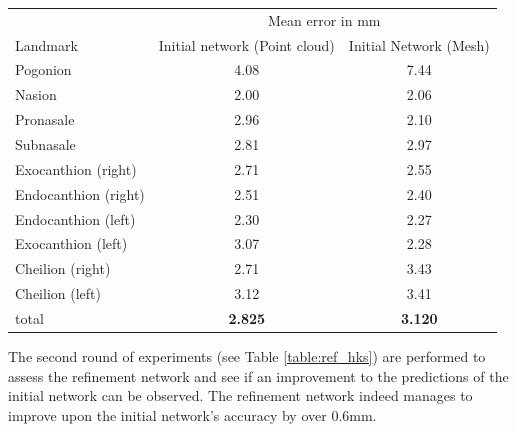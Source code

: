 \documentclass[class=article, crop=false]{standalone}
\begin{document}
\begin{table}[!htbp]
\label{table:pcl_vs_mesh}
\begin{tabularx}{\textwidth}{l|c|c}
\toprule
 & \multicolumn{2}{c}{Mean error in mm} \\\cmidrule(lr){2-3}
Landmark               & \hspace{0.3cm} Initial network (Point cloud) \hspace{0.3cm}  &  \hspace{0.3cm} Initial Network (Mesh) \hspace{0.3cm}      
\\
\midrule
Pogonion               & 4.08       & 7.44                                                                        \\
Nasion                 & 2.00       & 2.06  \\ %
Pronasale              & 2.96       & 2.10 \\
Subnasale              & 2.81       & 2.97 \\
Exocanthion (right)    & 2.71       & 2.55 \\
Endocanthion (right)   & 2.51       & 2.40 \\
Endocanthion (left)    & 2.30       & 2.27 \\
Exocanthion (left)     & 3.07       & 2.28\\
Cheilion (right)       & 2.71       & 3.43 \\
Cheilion (left)        & 3.12       & 3.41 \\
\bottomrule
total & \textbf{2.825} & \textbf{3.120} 
\end{tabularx}
\end{table}

The second round of experiments (see Table \ref{table:ref_hks}) are performed to assess the refinement network and see if an improvement to the predictions of the initial network can be observed. The refinement network indeed manages to improve upon the initial network's accuracy by over 0.6mm. 
\end{document}
